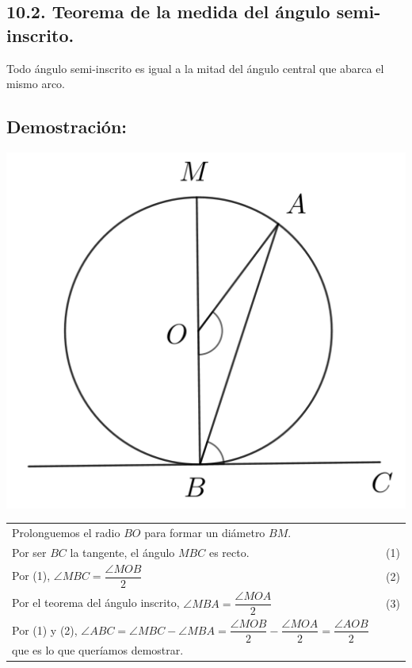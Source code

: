\documentclass[12pt,a4paper]{article}
\begin{document}
\subsection*{10.2. Teorema de la medida del ángulo semi-inscrito.}
Todo ángulo semi-inscrito es igual a la mitad del ángulo central que abarca el mismo arco.
\subsection*{Demostración:}
\begin{center}
\includegraphics[scale=0.6]{circulo 3.png} 
\end{center}
\begin{tabular}{p{15.9 cm} p{1cm}}
Prolonguemos el radio  $BO$ para formar un diámetro $BM$. 
\\Por ser $BC$ la tangente, el ángulo $MBC$ es recto. &(1)
\\Por (1), $\angle MBC = \dfrac{\angle MOB}{2}$ &(2)
\\Por el teorema del ángulo inscrito, $\angle MBA = \dfrac{\angle MOA }{2}$&(3)
\\Por (1) y (2), $\angle ABC = \angle MBC - \angle MBA= \dfrac{\angle MOB}{2}-\dfrac{\angle MOA}{2}=\dfrac{\angle AOB}{2}$ que es lo que queríamos demostrar.
\end{tabular}
\end{document}

